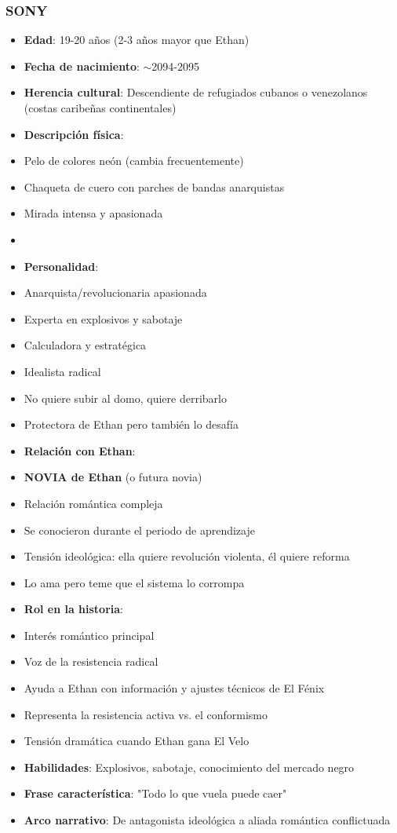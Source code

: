 \documentclass[11pt,a4paper]{report}
\begin{document}
\subsubsection{SONY}
\begin{itemize}
  \item \textbf{Edad}: 19-20 años (2-3 años mayor que Ethan)
  \item \textbf{Fecha de nacimiento}: $\sim$2094-2095
  \item \textbf{Herencia cultural}: Descendiente de refugiados cubanos o venezolanos (costas caribeñas continentales)
  \item \textbf{Descripción física}: 
  \item Pelo de colores neón (cambia frecuentemente)
  \item Chaqueta de cuero con parches de bandas anarquistas
  \item Mirada intensa y apasionada
  \item [Más detalles a desarrollar]
  \item \textbf{Personalidad}: 
  \item Anarquista/revolucionaria apasionada
  \item Experta en explosivos y sabotaje
  \item Calculadora y estratégica
  \item Idealista radical
  \item No quiere subir al domo, quiere derribarlo
  \item Protectora de Ethan pero también lo desafía
  \item \textbf{Relación con Ethan}: 
  \item \textbf{NOVIA de Ethan} (o futura novia)
  \item Relación romántica compleja
  \item Se conocieron durante el periodo de aprendizaje
  \item Tensión ideológica: ella quiere revolución violenta, él quiere reforma
  \item Lo ama pero teme que el sistema lo corrompa
  \item \textbf{Rol en la historia}: 
  \item Interés romántico principal
  \item Voz de la resistencia radical
  \item Ayuda a Ethan con información y ajustes técnicos de El Fénix
  \item Representa la resistencia activa vs. el conformismo
  \item Tensión dramática cuando Ethan gana El Velo
  \item \textbf{Habilidades}: Explosivos, sabotaje, conocimiento del mercado negro
  \item \textbf{Frase característica}: "Todo lo que vuela puede caer"
  \item \textbf{Arco narrativo}: De antagonista ideológica a aliada romántica conflictuada

\end{itemize}
\end{document}
